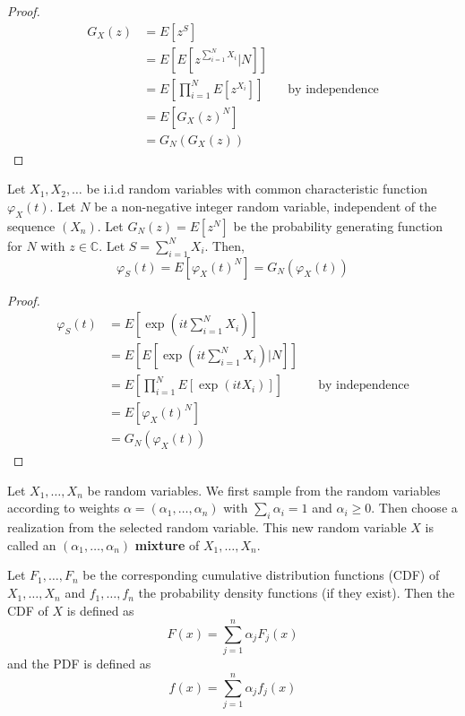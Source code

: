 \begin{proof}
\begin{align*}
    G_X(z) &= E[ z^S ]\\
    &= E[ E[ z^{\sum_{i = 1}^N X_i} | N ]]\\
    &= E \left[ \prod_{i = 1}^N E[z^{X_i}] \right] && \text{by independence}\\
    &= E[ G_X(z)^N]\\
    &= G_N(G_X(z))
\end{align*}
\end{proof}

\begin{theorem}\label{thm:char_func_random_sum}
Let $X_1, X_2, \ldots$ be i.i.d random variables with common characteristic function $\varphi_X(t)$.
Let $N$ be a non-negative integer random variable, independent of the sequence $(X_n)$.
Let $G_N(z) = E[z^N]$ be the probability generating function for $N$ with $z \in \mathbb C$.
Let $S = \sum_{i = 1}^N X_i$.
Then,
$$
\varphi_S(t) = E[\varphi_X(t)^N] = G_N(\varphi_X(t))
$$
\end{theorem}

\begin{proof}
\begin{align*}
    \varphi_S(t) &= E[ \exp(it \sum_{i = 1}^N X_i) ]\\
    &= E[ E[ \exp(it \sum_{i = 1}^N X_i) | N ]]\\
    &= E \left[ \prod_{i = 1}^N E[\exp(it X_i)] \right] && \text{by independence}\\
    &= E[\varphi_X(t)^N]\\
    &= G_N(\varphi_X(t))
\end{align*}
\end{proof}

\begin{defn}
Let $X_1,\ldots, X_n$ be random variables.
We first sample from the random variables according to weights $\alpha = (\alpha_1, \ldots, \alpha_n)$ with $\sum_i \alpha_i = 1$ and $\alpha_i \geq 0$.
Then choose a realization from the selected random variable.
This new random variable $X$ is called an $(\alpha_1, \ldots, \alpha_n)$ \textbf{mixture} of $X_1,\ldots, X_n$.

Let $F_1, \ldots, F_n$ be the corresponding cumulative distribution functions (CDF) of $X_1, \ldots, X_n$ and $f_1, \ldots, f_n$ the probability density functions (if they exist).
Then the CDF of $X$ is defined as
$$
F(x) = \sum_{j = 1}^n \alpha_j F_j(x)
$$
and the PDF is defined as
$$
f(x) = \sum_{j = 1}^n \alpha_j f_j(x)
$$
\end{defn}

